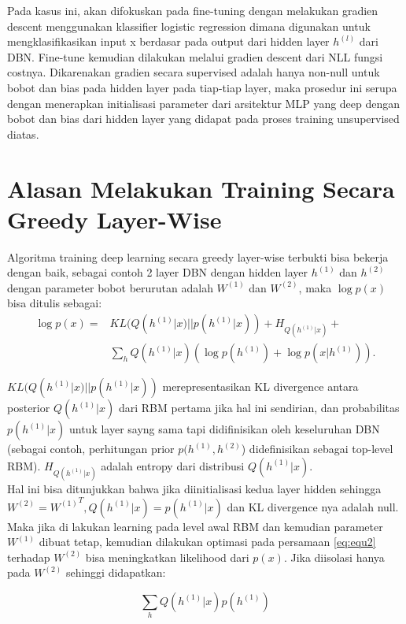 Pada kasus ini, akan difokuskan pada fine-tuning dengan melakukan gradien descent menggunakan klassifier logistic regression dimana digunakan untuk mengklasifikasikan input x berdasar pada output dari hidden layer $h^{(l)}$ dari DBN. Fine-tune kemudian dilakukan melalui gradien descent dari NLL fungsi costnya. Dikarenakan gradien secara supervised adalah hanya non-null untuk bobot dan bias pada hidden layer pada tiap-tiap layer, maka prosedur ini serupa dengan menerapkan initialisasi parameter dari arsitektur MLP yang deep dengan bobot dan bias dari hidden layer yang didapat pada proses training unsupervised diatas.


\section{Alasan Melakukan Training Secara Greedy Layer-Wise}

Algoritma training deep learning secara greedy layer-wise terbukti bisa bekerja dengan baik, sebagai contoh 2 layer DBN dengan hidden layer $h^{(1)}$ dan $h^{(2)}$ dengan parameter bobot berurutan adalah $W^{(1)}$ dan $W^{(2)}$, \citep{hinton2006reducing} maka $\log
p(x)$ bisa ditulis sebagai:
\begin{equation}
\begin{aligned}
\log p(x) = &KL(Q(h^{(1)}|x)||p(h^{(1)}|x)) + H_{Q(h^{(1)}|x)} + \\
            &\sum_h Q(h^{(1)}|x)(\log p(h^{(1)}) + \log p(x|h^{(1)})).
\end{aligned}
\label{eq:equ2}
\end{equation}

$KL(Q(h^{(1)}|x) || p(h^{(1)}|x))$ merepresentasikan KL divergence antara posterior $Q(h^{(1)}|x)$ dari RBM pertama jika hal ini sendirian, dan probabilitas $p(h^{(1)}|x)$ untuk layer sayng sama tapi didifinisikan oleh keseluruhan DBN (sebagai contoh, perhitungan prior $p(h^{(1)},h^{(2)}$) didefinisikan sebagai top-level RBM). $H_{Q(h^{(1)}|x)}$ adalah entropy dari distribusi $Q(h^{(1)}|x)$.\\
Hal ini bisa ditunjukkan bahwa jika diinitialisasi kedua layer hidden sehingga $W^{(2)}={W^{(1)}}^T, Q(h^{(1)}|x)=p(h^{(1)}|x)$ dan KL divergence nya adalah null. Maka jika di lakukan learning pada level awal RBM dan kemudian parameter $ W^{(1)}$ dibuat tetap, kemudian dilakukan optimasi pada persamaan \ref{eq:equ2} terhadap $W^{(2)}$ bisa meningkatkan likelihood dari $p(x)$.
Jika diisolasi hanya pada $W^{(2)}$ sehinggi didapatkan:

\[\sum_h Q(h^{(1)}|x)p(h^{(1)})\]

